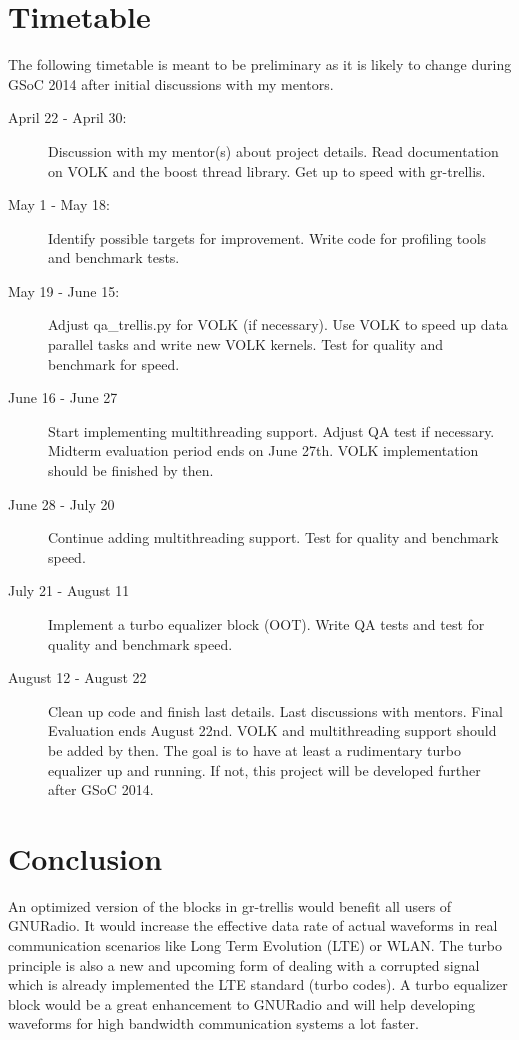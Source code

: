 \documentclass[11pt,		%
	    DIV12,		%
	    a4paper,		%
	    final,		%
	    halfparskip,	%
	    ]{scrartcl}		%
\begin{document}
\section{Timetable}
The following timetable is meant to be preliminary as it is likely to change during GSoC 2014 after initial discussions with my mentors.   
\begin{description}
  \item[April 22 - April 30:] Discussion with my mentor(s) about project details. Read documentation on VOLK and the boost thread library. Get up to speed with gr-trellis.
  \item[May 1 - May 18:]  Identify possible targets for improvement. Write code for profiling tools and benchmark tests. 
  \item[May 19 - June 15:] Adjust qa\_trellis.py for VOLK (if necessary). Use VOLK to speed up data parallel tasks and write new VOLK kernels. Test for quality and benchmark for speed.
  \item[June 16 - June 27] Start implementing multithreading support. Adjust QA test if necessary. Midterm evaluation period ends on June 27th. VOLK implementation should be finished by then.
  \item[June 28 - July 20] Continue adding multithreading support. Test for quality and benchmark speed. 
  \item[July 21 - August 11] Implement a turbo equalizer block (OOT). Write QA tests and test for quality and benchmark speed. 
  \item[August 12 - August 22] Clean up code and finish last details. Last discussions with mentors. Final Evaluation ends August 22nd. VOLK and multithreading support should be added by then. The goal is to have at least a rudimentary turbo equalizer up and running. If not, this project will be developed further after GSoC 2014.     
\end{description}     
\section{Conclusion}
An optimized version of the blocks in gr-trellis would benefit all users of GNURadio. It would increase the effective data rate of actual waveforms in real communication scenarios like Long Term Evolution (LTE) or WLAN. The turbo principle is also a new and upcoming form of dealing with a corrupted signal which is already implemented the LTE standard (turbo codes). A turbo equalizer block would be a great enhancement to GNURadio and will help developing waveforms for high bandwidth communication systems a lot faster.
\end{document}
